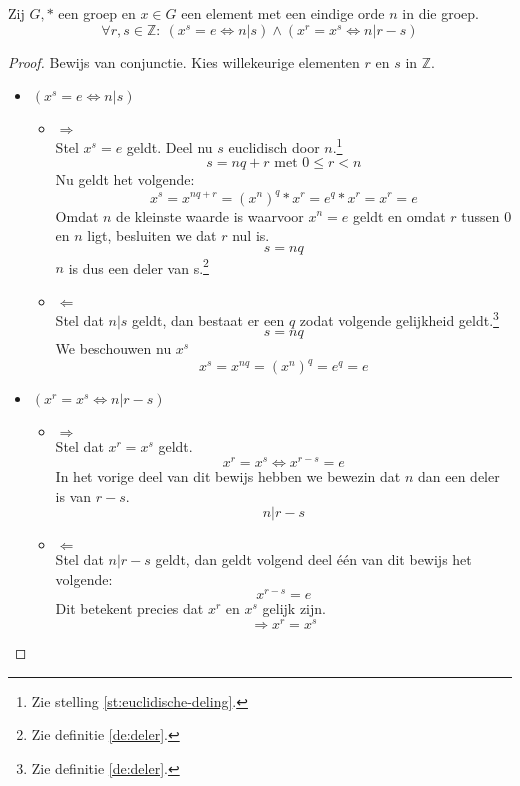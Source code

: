 \documentclass[main.tex]{subfiles}
\begin{document}
\begin{ei}
  \label{ei:groep-eindige-orde-deelbaarheid}
  Zij $G,*$ een groep en $x \in G$ een element met een eindige orde $n$ in die groep.
  \[ \forall r,s \in \mathbb{Z}:\ (x^{s} = e \Leftrightarrow n | s) \wedge (x^{r} = x^{s} \Leftrightarrow n | r-s)\]
  \begin{proof}
    Bewijs van conjunctie.
    Kies willekeurige elementen $r$ en $s$ in $\mathbb{Z}$.
    \begin{itemize}
    \item $(x^{s} = e \Leftrightarrow n | s)$
      \begin{itemize}
      \item $\Rightarrow$\\
        Stel $x^{s} = e$ geldt.
        Deel nu $s$ euclidisch door $n$.\footnote{Zie stelling \ref{st:euclidische-deling}.}
        \[ s = nq + r \text{ met } 0 \le r < n \]
        Nu geldt het volgende:
        \[ x^{s} = x^{nq + r} = (x^{n})^{q} * x^{r} = e^{q} * x^{r} = x^{r} = e\]
        Omdat $n$ de kleinste waarde is waarvoor $x^{n}=e$ geldt en omdat $r$ tussen $0$ en $n$ ligt, besluiten we dat $r$ nul is.
        \[ s = nq \]
        $n$ is dus een deler van s.\footnote{Zie definitie \ref{de:deler}.}
      \item $\Leftarrow$\\
        Stel dat $n | s$ geldt, dan bestaat er een $q$ zodat volgende gelijkheid geldt.\footnote{Zie definitie \ref{de:deler}.}
        \[ s = nq \]
        We beschouwen nu $x^{s}$
        \[ x^{s} = x^{nq} = (x^{n})^{q} = e^{q} = e\]
      \end{itemize}
    \item $(x^{r} = x^{s} \Leftrightarrow n | r-s)$
      \begin{itemize}
      \item $\Rightarrow$\\
        Stel dat $x^{r} = x^{s}$ geldt.
        \[ x^{r} = x^{s} \Leftrightarrow x^{r-s} = e \]
        In het vorige deel van dit bewijs hebben we bewezin dat $n$ dan een deler is van $r-s$.
        \[ n|r-s \]
      \item $\Leftarrow$\\
        Stel dat $n | r-s$ geldt, dan geldt volgend deel \'e\'en van dit bewijs het volgende:
        \[ x^{r-s} = e \]
        Dit betekent precies dat $x^{r}$ en $x^{s}$ gelijk zijn.
        \[ \Rightarrow x^{r} = x^{s} \]
      \end{itemize}
    \end{itemize}
  \end{proof}
\end{ei}
\end{document}

